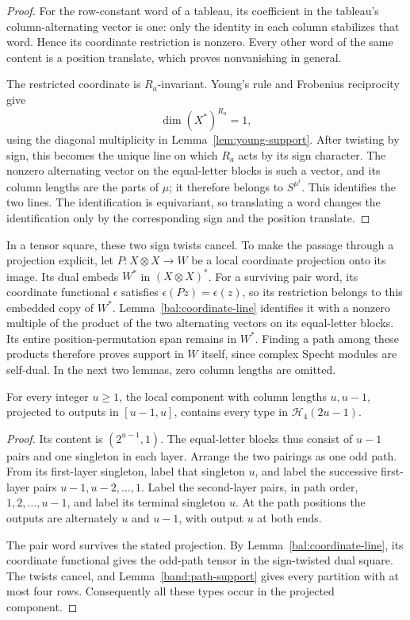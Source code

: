\begin{proof}
For the row-constant word of a tableau, its coefficient in the
tableau's column-alternating vector is one: only the identity in
each column stabilizes that word.  Hence its coordinate restriction
is nonzero.  Every other word of the same content is a position
translate, which proves nonvanishing in general.

The restricted coordinate is $R_a$-invariant. Young's rule and
Frobenius reciprocity give
\[
 \dim (X^*)^{R_a}=1,
\]
using the diagonal multiplicity in Lemma~\ref{lem:young-support}.
After twisting by sign, this becomes the unique line on which
$R_a$ acts by its sign character.  The nonzero alternating vector
on the equal-letter blocks is such a vector, and its column
lengths are the parts of $\mu$; it therefore belongs to
$S^{\mu^t}$.  This identifies the two lines.
The identification is equivariant, so translating a word changes
the identification only by the corresponding sign and the
position translate.
\end{proof}

In a tensor square, these two sign twists cancel. To make the
passage through a projection explicit, let
$P:X\otimes X\longrightarrow W$ be a local coordinate projection
onto its image. Its dual embeds $W^*$ in $(X\otimes X)^*$.
For a surviving pair word, its coordinate functional $\epsilon$
satisfies $\epsilon(Pz)=\epsilon(z)$, so its restriction belongs
to this embedded copy of $W^*$. Lemma~\ref{bal:coordinate-line}
identifies it with a nonzero multiple of the product of the two
alternating vectors on its equal-letter blocks. Its entire
position-permutation span remains in $W^*$. Finding a path among
these products therefore proves support in $W$ itself, since
complex Specht modules are self-dual. In the next two lemmas, zero
column lengths are omitted.

\begin{lemma}
\label{bal:neighboring}
For every integer $u\ge1$, the local component with column lengths
$u,u-1$, projected to
outputs in $[u-1,u]$, contains every type in
$\mathcal H_4(2u-1)$.
\end{lemma}

\begin{proof}
Its content is $(2^{u-1},1)$.  The equal-letter blocks thus consist
of $u-1$ pairs and one singleton in each layer.  Arrange the two
pairings as one odd path.  From its first-layer singleton, label
that singleton $u$, and label the successive first-layer pairs
$u-1,u-2,\ldots,1$.  Label the second-layer pairs, in path order,
$1,2,\ldots,u-1$, and label its terminal singleton $u$.
At the path positions the outputs are alternately $u$ and $u-1$,
with output $u$ at both ends.

The pair word survives the stated projection.  By
Lemma~\ref{bal:coordinate-line}, its coordinate functional gives
the odd-path tensor in the sign-twisted dual square.  The twists
cancel, and Lemma~\ref{band:path-support} gives every partition
with at most four rows.  Consequently all these types occur in
the projected component.
\end{proof}

